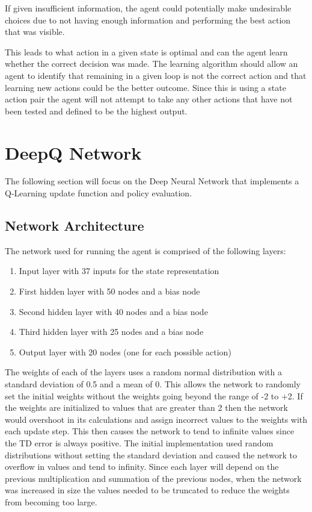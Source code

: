 If given insufficient information, the agent could potentially make undesirable
choices due to not having enough information and performing the best
action that was visible.

This leads to what action in a given state is optimal and can the agent learn whether
the correct decision was made. The learning algorithm should allow an agent
to identify that remaining in a given loop is not the correct action and that learning
new actions could be the better outcome.
Since this is using a state action pair the agent will not attempt to take any
other actions that have not been tested and defined to be the highest output.

\section{DeepQ Network}
The following section will focus on the Deep Neural Network that implements a Q-Learning update function and policy evaluation.
\subsection{Network Architecture}
The network used for running the agent is comprised of the following layers:
\begin{enumerate}
\item Input layer with 37 inputs for the state representation
\item First hidden layer with 50 nodes and a bias node
\item Second hidden layer with 40 nodes and a bias node
\item Third hidden layer with 25 nodes and a bias node
\item Output layer with 20 nodes (one for each possible action)
\end{enumerate}
The weights of each of the layers uses a random normal distribution with a standard deviation of 0.5 and a mean of 0. This allows the network to randomly set the initial weights without the weights going beyond the range of -2 to +2. If the weights are initialized to values that are greater than 2 then the network would overshoot in its calculations and assign incorrect values to the weights with each update step. This then causes the network to tend to infinite values since the TD error is always positive. The initial implementation used random distributions without setting the standard deviation and caused the network to overflow in values and tend to infinity. Since each layer will depend on the previous multiplication and summation of the previous nodes, when the network was increased in size the values needed to be truncated to reduce the weights from becoming too large.

